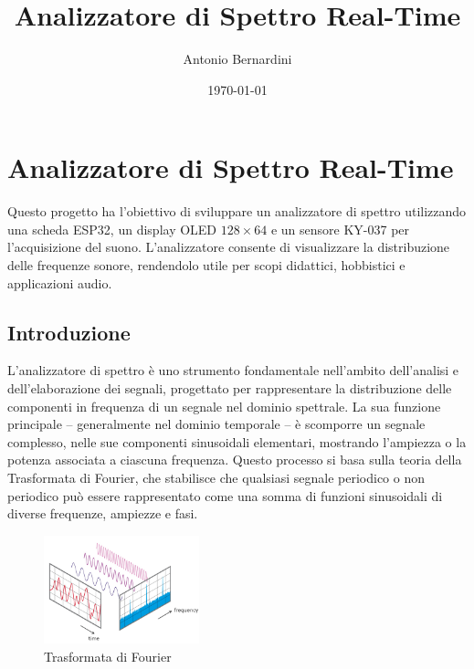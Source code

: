 \documentclass[a4paper,12pt]{report}  %
\title{Analizzatore di Spettro Real-Time}            %
\author{Antonio Bernardini} %
\date{\today}               %
\begin{document}
\maketitle  

\newpage  %

\tableofcontents

\newpage  %

\chapter{Analizzatore di Spettro Real-Time}

Questo progetto ha l'obiettivo di sviluppare un analizzatore di spettro utilizzando una scheda ESP32, un display OLED $128 \times 64$ e un sensore KY-037 per l'acquisizione del suono.
L'analizzatore consente di visualizzare la distribuzione delle frequenze sonore, rendendolo utile per scopi didattici, hobbistici e applicazioni audio.

\section{Introduzione}
L'analizzatore di spettro è uno strumento fondamentale nell'ambito dell'analisi e dell'elaborazione dei segnali, progettato per rappresentare la distribuzione delle componenti in frequenza di un segnale nel dominio spettrale.
La sua funzione principale -- generalmente nel dominio temporale -- è scomporre un segnale complesso, nelle sue componenti sinusoidali elementari, mostrando l'ampiezza o la potenza associata a ciascuna frequenza.
Questo processo si basa sulla teoria della Trasformata di Fourier, che stabilisce che qualsiasi segnale periodico o non periodico può essere rappresentato come una somma di funzioni sinusoidali di diverse frequenze, ampiezze e fasi.

\begin{figure}[h]
    \centering
    \includegraphics[width=0.4\textwidth]{imgs/time-to-frequency.png}
    \caption{Trasformata di Fourier}
    \label{fig:time_to_frequency}
\end{figure}
\end{document}
